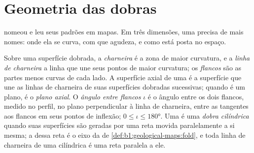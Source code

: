 \section{Geometria das dobras}\label{sec:b1:faults-folds-fabrics:folds}

 nomeou  e leu seus padrões em mapas. Em três dimensões, uma  precisa de mais nomes: onde ela se curva, com que agudeza, e como está posta no espaço.

\begin{definition}\label{def:b1:faults-folds-fabrics:fold-elements}
Sobre uma superfície dobrada, a \emph{charneira} é a zona de maior curvatura, e a \emph{linha de charneira} a linha que une seus pontos de maior curvatura; os \emph{flancos} são as partes menos curvas de cada lado. A superfície axial de uma  é a superfície que une as linhas de charneira de suas superfícies dobradas sucessivas; quando é um plano, é o \emph{plano axial}. O \emph{ângulo entre flancos} $\iota$ é o ângulo entre os dois flancos, medido no perfil, no plano perpendicular à linha de charneira, entre as tangentes aos flancos em seus pontos de inflexão; $0 \le \iota \le \ang{180}$. Uma  é uma \emph{dobra cilíndrica} quando suas superfícies são geradas por uma reta movida paralelamente a si mesma; a  dessa reta é o eixo da  de \cref{def:b1:geological-maps:fold}, e toda linha de charneira de uma  cilíndrica é uma reta paralela a ele.
\end{definition}

